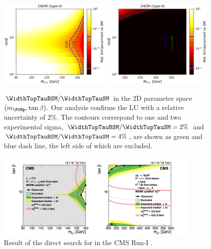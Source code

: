 \begin{figure}[ht]
    \centering
    \includegraphics[width=0.49\textwidth]{chapters/RelatedWorks/sectionBSM/figures/RelEnhance2.png}
    \includegraphics[width=0.49\textwidth]{chapters/RelatedWorks/sectionBSM/figures/RelEnhance2_heavy.png}
    \caption{$\WidthTopTauBSM/\WidthTopTauSM$  in the 2D parameter space $(m_{\PSHp}, \tan\beta)$. Our analysis confirms the LU with a relative uncertainty of $2\%$. The contours correspond to one and two experimental sigma, $\WidthTopTauBSM/\WidthTopTauSM = 2\%$ and $\WidthTopTauBSM/\WidthTopTauSM = 4\%$, are shown as green and blue dash line, the left side of which are excluded.  }
    \label{fig:relatedWorks:bsm:chargedHiggs:relEnahnce2d}
\end{figure}

\begin{figure}[ht]
    \centering
    \includegraphics[width=0.9\textwidth]{chapters/RelatedWorks/sectionBSM/figures/2HDM_search.png}
    \caption{Result of the direct search for \PSHp in the CMS Run-I \cite{Khachatryan:2015qxa}. }
    \label{fig:relatedWorks:bsm:chargedHiggs:directsearch}
\end{figure}


